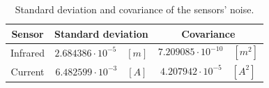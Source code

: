 \begin{table}[H]
    \centering

    \begin{tabular}{|c|c|c|}
        \hline
        \textbf{Sensor} & \textbf{Standard deviation}        & \textbf{Covariance}                   \\
        \hline
        Infrared        & $2.684386 \cdot 10^{-5} \quad [m]$ & $7.209085 \cdot 10^{-10} \quad [m^2]$ \\
        Current         & $6.482599 \cdot 10^{-3} \quad [A]$ & $4.207942 \cdot 10^{-5} \quad [A^2]$  \\
        \hline
    \end{tabular}

    \caption{Standard deviation and covariance of the sensors' noise.}
    \label{tab:sensors_noise}

\end{table}
